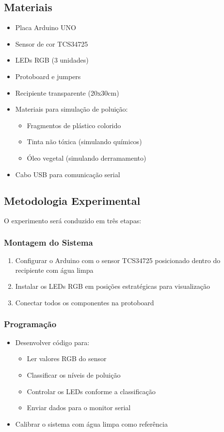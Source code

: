 \documentclass[12pt]{article}
\begin{document}
\subsection{Materiais}
\begin{itemize}
    \item Placa Arduino UNO
    \item Sensor de cor TCS34725
    \item LEDs RGB (3 unidades)
    \item Protoboard e jumpers
    \item Recipiente transparente (20x30cm)
    \item Materiais para simulação de poluição:
    \begin{itemize}
        \item Fragmentos de plástico colorido
        \item Tinta não tóxica (simulando químicos)
        \item Óleo vegetal (simulando derramamento)
    \end{itemize}
    \item Cabo USB para comunicação serial
\end{itemize}

\subsection{Metodologia Experimental}

O experimento será conduzido em três etapas:

\subsubsection{Montagem do Sistema}
\begin{enumerate}
    \item Configurar o Arduino com o sensor TCS34725 posicionado dentro do recipiente com água limpa
    \item Instalar os LEDs RGB em posições estratégicas para visualização
    \item Conectar todos os componentes na protoboard
\end{enumerate}

\subsubsection{Programação}
\begin{itemize}
    \item Desenvolver código para:
    \begin{itemize}
        \item Ler valores RGB do sensor
        \item Classificar os níveis de poluição
        \item Controlar os LEDs conforme a classificação
        \item Enviar dados para o monitor serial
    \end{itemize}
    \item Calibrar o sistema com água limpa como referência
\end{itemize}
\end{document}
